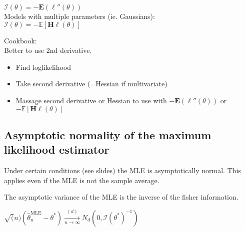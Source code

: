 $\mathcal{I}(\theta ) = - \mathbf{E}(\ell ''(\theta ))$\\

Models with multiple parameters (ie. Gaussians):\\

$\mathcal{I}(\theta ) = -\mathbb E\left[\mathbf{H}\ell (\theta )\right]$

Cookbook:\\

Better to use 2nd derivative.\\

\begin{itemize}
  \item Find loglikelihood
  \item Take second derivative (=Hessian if multivariate)
  \item Massage second derivative or Hessian to use with $- \mathbf{E}(\ell ''(\theta ))$ or $-\mathbb E\left[\mathbf{H}\ell (\theta )\right]$
\end{itemize}

\subsection*{Asymptotic normality of the maximum likelihood estimator}

Under certain conditions (see slides) the MLE is asymptotically normal. This applies even if the MLE is not the sample average.

The asymptotic variance of the MLE is the inverse of the fisher information.

$\sqrt(n)(\widehat{\theta }_ n^{\text {MLE}} - \theta^*) \xrightarrow[n \rightarrow \infty]{(d)} N_d(0,\mathcal{I}(\theta^* )^{-1})$\\